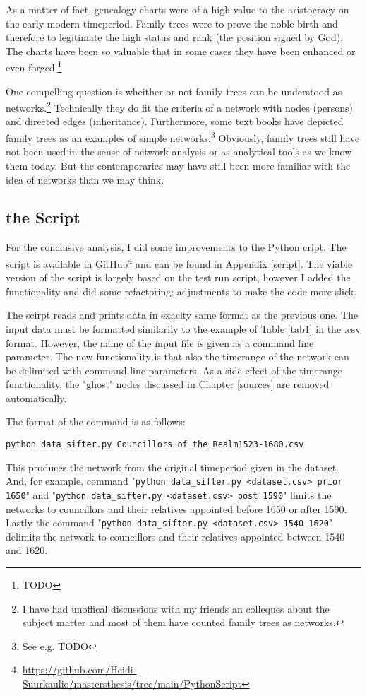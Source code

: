 As a matter of fact, genealogy charts were of a high value to the aristocracy on the early modern timeperiod. Family trees were to prove the noble birth and therefore to legitimate the high status and rank (the position signed by God). The charts have been so valuable that in some cases they have been enhanced or even forged.\footnote{TODO}

One compelling question is wheither or not family trees can be understood as networks.\footnote{I have had unoffical discussions with my friends an colleques about the subject matter and most of them have counted family trees as networks.} Technically they do fit the criteria of a network with nodes (persons) and directed edges (inheritance). Furthermore, some text books have depicted family trees as an examples of simple networks.\footnote{See e.g. TODO} Obviously, family trees still have not been used in the sense of network analysis or as analytical tools as we know them today. But the contemporaries may have still been more familiar with the idea of networks than we may think.

\subsection{the Script}
For the conclusive analysis, I did some improvements to the Python cript. The script is available in GitHub\footnote{\url{https://github.com/Heidi-Suurkaulio/mastersthesis/tree/main/PythonScript}} and can be found in Appendix \ref{script}. The viable version of the script is largely based on the test run script, however I added the functionality and did some refactoring; adjustments to make the code more slick. 

The scirpt reads and prints data in exaclty same format as the previous one. The input data must be formatted similarily to the example of Table \ref{tab1} in the .csv format. However, the name of the input file is given as a command line parameter. The new functionality is that also the timerange of the network can be delimited with command line parameters. As a side-effect of the timerange functionality, the "ghost" nodes discussed in Chapter \ref{sources} are removed automatically.

The format of the command is as follows: 
\begin{verbatim}
python data_sifter.py Councillors_of_the_Realm1523-1680.csv
\end{verbatim}

This produces the network from the original timeperiod given in the dataset. And, for example, command "\texttt{python data\_sifter.py <dataset.csv> prior 1650}" and "\texttt{python data\_sifter.py <dataset.csv> post 1590}" limits the networks to councillors and their relatives appointed before 1650 or after 1590. Lastly the command "\texttt{python data\_sifter.py <dataset.csv> 1540 1620}" delimits the network to councillors and their relatives appointed between 1540 and 1620.


